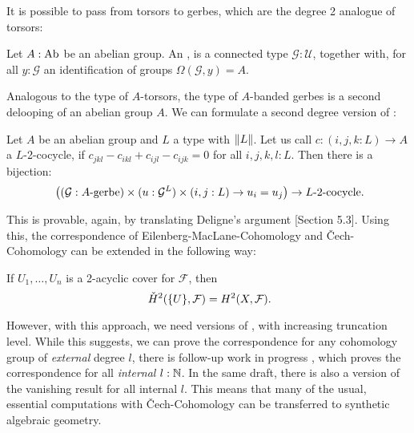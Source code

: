It is possible to pass from torsors to gerbes,
which are the degree 2 analogue of torsors:

\begin{definition}
  \label{gerbe}
  Let $A:\operatorname{Ab}$ be an abelian group.
  An , is a connected type $\mathcal G:\mathcal U$,
  together with, for all $y:\mathcal G$ an identification of groups $\Omega (\mathcal G,y)=A$.
\end{definition}

Analogous to the type of $A$-torsors, the type of $A$-banded gerbes is a second delooping of an abelian group $A$.
We can formulate a second degree version of :

\begin{theorem}
  \label{deligne-construction-gerbes}
  Let $A$ be an abelian group and $L$ a type with $\lVert L \rVert$.
  Let us call $c:(i,j,k : L)\to A$ a $L$-2-cocycle,
  if $c_{jkl}-c_{ikl}+c_{ijl}-c_{ijk}=0$ for all $i,j,k,l : L$.
  Then there is a bijection:
  \[
    \left((\mathcal G:\text{$A$-gerbe})\times (u:\mathcal G^{L})\times (i,j : L) \to u_i=u_j\right) \to \text{$L$-2-cocycle}
    \rlap{.}
  \]
\end{theorem}

This is provable, again, by translating Deligne's argument \cite{Deligne91}[Section 5.3].
Using this, the correspondence of Eilenberg-MacLane-Cohomology and \v{C}ech-Cohomology can be extended in the following way:

\begin{theorem}
  If $U_1,\dots,U_n$ is a 2-acyclic cover for $\mathcal F$, then
  \[
    \check{H}^2(\{U\},\mathcal F)=H^2(X,\mathcal F)\rlap{.}
  \]  
\end{theorem}

However, with this approach, we need versions of , with increasing truncation level.
While this suggests, we can prove the correspondence for any cohomology group of \emph{external} degree $l$,
there is follow-up work in progress \cite{cech-draft},
which proves the correspondence for all \emph{internal} $l:\mathbb{N}$.
In the same draft, there is also a version of the vanishing result for all internal $l$.
This means that many of the usual, essential computations with \v{C}ech-Cohomology can be transferred to synthetic algebraic geometry.
